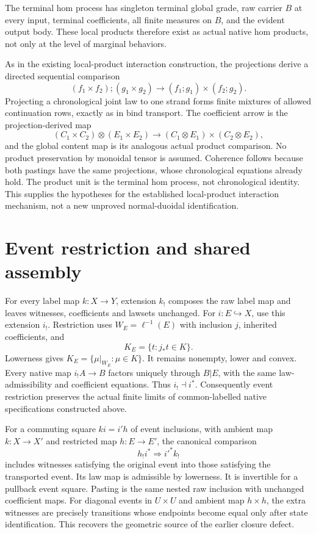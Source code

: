 \documentclass{article}
\begin{document}
The terminal hom process has singleton terminal global grade, raw carrier $B$ at every input, terminal coefficients, all finite measures on $B$, and the evident output body. These local products therefore exist as actual native hom products, not only at the level of marginal behaviors.

As in the existing local-product interaction construction, the projections derive a directed sequential comparison
\[(f_1\times f_2);(g_1\times g_2)\longrightarrow(f_1;g_1)\times(f_2;g_2).\]
Projecting a chronological joint law to one strand forms finite mixtures of allowed continuation rows, exactly as in bind transport. The coefficient arrow is the projection-derived map
\[(C_1\times C_2)\otimes(E_1\times E_2)\to(C_1\otimes E_1)\times(C_2\otimes E_2),\]
and the global content map is its analogous actual product comparison. No product preservation by monoidal tensor is assumed. Coherence follows because both pastings have the same projections, whose chronological equations already hold. The product unit is the terminal hom process, not chronological identity. This supplies the hypotheses for the established local-product interaction mechanism, not a new unproved normal-duoidal identification.
\section{Event restriction and shared assembly}
For every label map $k:X\to Y$, extension $k_!$ composes the raw label map and leaves witnesses, coefficients and lawsets unchanged. For $i:E\hookrightarrow X$, use this extension $i_!$. Restriction uses $W_E=\ell^{-1}(E)$ with inclusion $j$, inherited coefficients, and
\[K_E=\{t:j_*t\in K\}.\]
Lowerness gives $K_E=\{\mu|_{W_E}:\mu\in K\}$. It remains nonempty, lower and convex. Every native map $i_!A\to B$ factors uniquely through $B|E$, with the same law-admissibility and coefficient equations. Thus $i_!\dashv i^*$. Consequently event restriction preserves the actual finite limits of common-labelled native specifications constructed above.

For a commuting square $ki=i'h$ of event inclusions, with ambient map $k:X\to X'$ and restricted map $h:E\to E'$, the canonical comparison
\[h_!i^*\Longrightarrow i'^*k_!\]
includes witnesses satisfying the original event into those satisfying the transported event. Its law map is admissible by lowerness. It is invertible for a pullback event square. Pasting is the same nested raw inclusion with unchanged coefficient maps. For diagonal events in $U\times U$ and ambient map $h\times h$, the extra witnesses are precisely transitions whose endpoints become equal only after state identification. This recovers the geometric source of the earlier closure defect.
\end{document}
